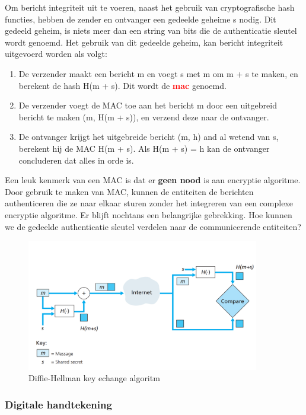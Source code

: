 \noindent Om bericht integriteit uit te voeren, naast het gebruik van cryptografische hash functies, hebben de zender en ontvanger een gedeelde geheime s nodig. Dit gedeeld geheim, is niets meer dan een string van bits die de authenticatie sleutel wordt genoemd. Het gebruik van dit gedeelde geheim, kan bericht integriteit uitgevoerd worden als volgt:
\begin{enumerate}
    \item De verzender maakt een bericht m en voegt s met m om m + s te maken, en berekent de hash H(m + s). Dit wordt de \textcolor{red}{\textbf{\acrfull{mac}}} genoemd.
    \item De verzender voegt de MAC toe aan het bericht m door een uitgebreid bericht te maken (m, H(m + s)), en verzend deze naar de ontvanger.
    \item De ontvanger krijgt het uitgebreide bericht (m, h) and al wetend van s, berekent hij de MAC H(m + s). Als H(m + s) = h kan de ontvanger concluderen dat alles in orde is.
\end{enumerate}
Een leuk kenmerk van een MAC is dat er \textbf{geen nood} is aan encryptie algoritme. Door gebruik te maken van MAC, kunnen de entiteiten de berichten authenticeren die ze naar elkaar sturen zonder het integreren van een complexe encryptie algoritme.
Er blijft nochtans een belangrijke gebrekking. Hoe kunnen we de gedeelde authenticatie sleutel verdelen naar de communicerende entiteiten?

\begin{figure}[h]
    \centering
    \includegraphics[width=4in]{./img/imghfdst8/Figure8-9.PNG}
    \caption{Diffie-Hellman key echange algoritm }      
    \label{fig:Diffie-Hellman key echange algoritm }
\end{figure}

\newpage

\subsubsection{Digitale handtekening}

